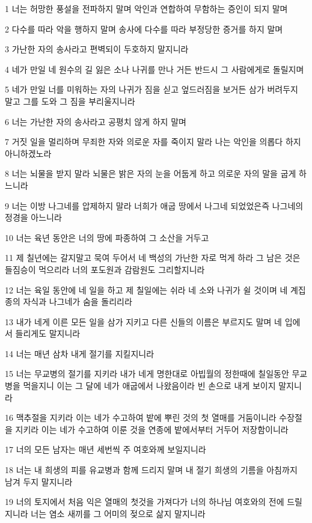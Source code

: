 \par 1 너는 허망한 풍설을 전파하지 말며 악인과 연합하여 무함하는 증인이 되지 말며
\par 2 다수를 따라 악을 행하지 말며 송사에 다수를 따라 부정당한 증거를 하지 말며
\par 3 가난한 자의 송사라고 편벽되이 두호하지 말지니라
\par 4 네가 만일 네 원수의 길 잃은 소나 나귀를 만나 거든 반드시 그 사람에게로 돌릴지며
\par 5 네가 만일 너를 미워하는 자의 나귀가 짐을 싣고 엎드러짐을 보거든 삼가 버려두지 말고 그를 도와 그 짐을 부리울지니라
\par 6 너는 가난한 자의 송사라고 공평치 않게 하지 말며
\par 7 거짓 일을 멀리하며 무죄한 자와 의로운 자를 죽이지 말라 나는 악인을 의롭다 하지 아니하겠노라
\par 8 너는 뇌물을 받지 말라 뇌물은 밝은 자의 눈을 어둡게 하고 의로운 자의 말을 굽게 하느니라
\par 9 너는 이방 나그네를 압제하지 말라 너희가 애굽 땅에서 나그네 되었었은즉 나그네의 정경을 아느니라
\par 10 너는 육년 동안은 너의 땅에 파종하여 그 소산을 거두고
\par 11 제 칠년에는 갈지말고 묵여 두어서 네 백성의 가난한 자로 먹게 하라 그 남은 것은 들짐승이 먹으리라 너의 포도원과 감람원도 그리할지니라
\par 12 너는 육일 동안에 네 일을 하고 제 칠일에는 쉬라 네 소와 나귀가 쉴 것이며 네 계집 종의 자식과 나그네가 숨을 돌리리라
\par 13 내가 네게 이른 모든 일을 삼가 지키고 다른 신들의 이름은 부르지도 말며 네 입에서 들리게도 말지니라
\par 14 너는 매년 삼차 내게 절기를 지킬지니라
\par 15 너는 무교병의 절기를 지키라 내가 네게 명한대로 아빕월의 정한때에 칠일동안 무교병을 먹을지니 이는 그 달에 네가 애굽에서 나왔음이라 빈 손으로 내게 보이지 말지니라
\par 16 맥추절을 지키라 이는 네가 수고하여 밭에 뿌린 것의 첫 열매를 거둠이니라 수장절을 지키라 이는 네가 수고하여 이룬 것을 연종에 밭에서부터 거두어 저장함이니라
\par 17 너의 모든 남자는 매년 세번씩 주 여호와께 보일지니라
\par 18 너는 내 희생의 피를 유교병과 함께 드리지 말며 내 절기 희생의 기름을 아침까지 남겨 두지 말지니라
\par 19 너의 토지에서 처음 익은 열매의 첫것을 가져다가 너의 하나님 여호와의 전에 드릴지니라 너는 염소 새끼를 그 어미의 젖으로 삶지 말지니라
